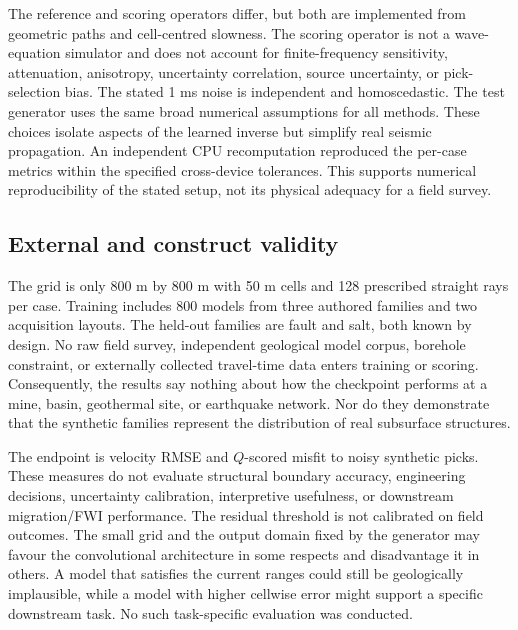 \documentclass[11pt]{article}
\begin{document}
The reference and scoring operators differ, but both are implemented from geometric paths and cell-centred slowness. The scoring operator is not a wave-equation simulator and does not account for finite-frequency sensitivity, attenuation, anisotropy, uncertainty correlation, source uncertainty, or pick-selection bias. The stated 1 ms noise is independent and homoscedastic. The test generator uses the same broad numerical assumptions for all methods. These choices isolate aspects of the learned inverse but simplify real seismic propagation. An independent CPU recomputation reproduced the per-case metrics within the specified cross-device tolerances. This supports numerical reproducibility of the stated setup, not its physical adequacy for a field survey.

\subsection{External and construct validity}
\label{sec:external-validity}
The grid is only 800 m by 800 m with 50 m cells and 128 prescribed straight rays per case. Training includes 800 models from three authored families and two acquisition layouts. The held-out families are fault and salt, both known by design. No raw field survey, independent geological model corpus, borehole constraint, or externally collected travel-time data enters training or scoring. Consequently, the results say nothing about how the checkpoint performs at a mine, basin, geothermal site, or earthquake network. Nor do they demonstrate that the synthetic families represent the distribution of real subsurface structures.

The endpoint is velocity RMSE and $Q$-scored misfit to noisy synthetic picks. These measures do not evaluate structural boundary accuracy, engineering decisions, uncertainty calibration, interpretive usefulness, or downstream migration/FWI performance. The residual threshold is not calibrated on field outcomes. The small grid and the output domain fixed by the generator may favour the convolutional architecture in some respects and disadvantage it in others. A model that satisfies the current ranges could still be geologically implausible, while a model with higher cellwise error might support a specific downstream task. No such task-specific evaluation was conducted.
\end{document}
